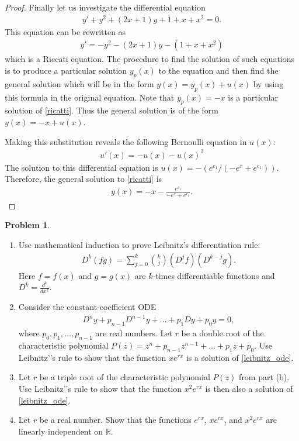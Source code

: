 \documentclass[12pt]{article}
\theoremstyle{definition}
\newtheorem{problem}{Problem}
\begin{document}
\begin{proof}
  Finally let us investigate the differential equation
  \begin{align*}
    y' + y^2 +(2x+1)y + 1 + x + x^2 = 0.
  \end{align*}
  This equation can be rewritten as
  \begin{align}\label{ricatti}
    y' = -y^2 -(2x+1)y - (1 + x + x^2)
  \end{align}
  which is a Riccati equation. The procedure to find the solution of such
  equations is to produce a particular solution $y_p(x)$ to the equation and then find the
  general solution which will be in the form $y(x) = y_p(x) + u(x)$ by using this formula in
  the original equation. Note that $y_p(x) = -x$ is a particular solution
  of \eqref{ricatti}. Thus the general solution is of the form $y(x) = -x + u(x)$.

  Making this substitution reveals the following Bernoulli equation in $u(x)$:
  \begin{align*}
    u'(x) = -u(x) -u(x)^2
  \end{align*}
  The solution to this differential equation is $u(x) = -(e^{c_1}/(-e^x + e^{c_1}))$.
  Therefore, the general solution to \eqref{ricatti} is
  \begin{align*}
    y(x)=-x-\frac{e^{c_1}}{-e^x + e^{c_1}}.
  \end{align*}

\end{proof}
\newpage


\begin{problem}
  \begin{enumerate}
    \item Use mathematical induction to prove Leibnitz's differentiation rule:
      \begin{align*}
        D^{k}(fg) = \sum_{j=0}^k \binom{k}{j}(D^j f) (D^{k-j}g).
      \end{align*}
      Here $f = f(x)$ and $g=g(x)$ are $k$-times differentiable functions and $D^k = \frac{d^k}{dx^k}$.
    \item Consider the constant-coefficient ODE
      \begin{align}\label{leibnitz_ode}
        D^n y + p_{n-1}D^{n-1}y + \dots + p_1 Dy + p_0 y = 0,
      \end{align}
      where $p_0, p_1, \dots, p_{n-1}$ are real numbers. Let $r$ be a double root of the characteristic polynomial
      $P(z) = z^n + p_{n-1} z^{n-1} + \dots + p_1 z + p_0.$ Use Leibnitz’'s rule to
      show that the function $xe^{rx}$ is a solution of \eqref{leibnitz_ode}.
    \item Let $r$ be a triple root of the characteristic polynomial $P(z)$ from part (b).
      Use Leibnitz'’s rule to show that the function $x^2 e^{rx}$
      is then also a solution of \eqref{leibnitz_ode}.
    \item Let $r$ be a real number. Show that the functions $e^{rx}$, $xe^{rx}$, and $x^2 e^{rx}$
      are linearly independent on $\mathbb{R}$.
  \end{enumerate}
\end{problem}
\end{document}
